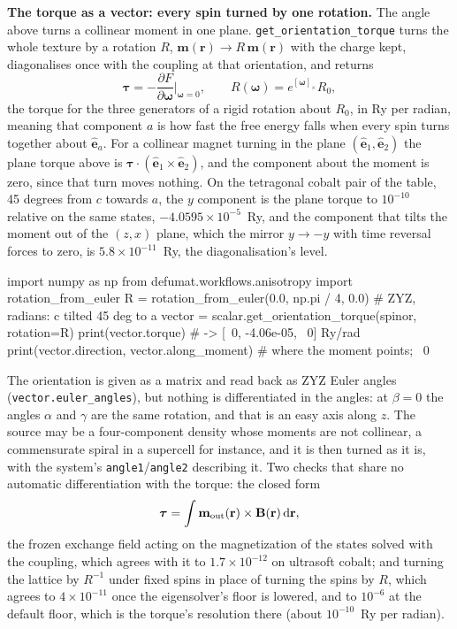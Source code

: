 \documentclass[11pt,a4paper]{article}
\newcommand{\code}[1]{\texttt{\small #1}}
\begin{document}
\textbf{The torque as a vector: every spin turned by one rotation.} The angle
above turns a collinear moment in one plane. \code{get\_orientation\_torque}
turns the whole texture by a rotation $R$, $\mathbf m(\mathbf r)\to
R\,\mathbf m(\mathbf r)$ with the charge kept, diagonalises once with the
coupling at that orientation, and returns
\begin{equation*}
  \boldsymbol\tau = -\frac{\partial F}{\partial\boldsymbol\omega}\bigg|_{\boldsymbol\omega=0},
  \qquad R(\boldsymbol\omega) = e^{[\boldsymbol\omega]_\times} R_0 ,
\end{equation*}
the torque for the three generators of a rigid rotation about $R_0$, in Ry per
radian, meaning that component $a$ is how fast the free energy falls when every
spin turns together about $\hat{\mathbf e}_a$. For a collinear magnet turning in
the plane $(\hat{\mathbf e}_1,\hat{\mathbf e}_2)$ the plane torque above is
$\boldsymbol\tau\cdot(\hat{\mathbf e}_1\times\hat{\mathbf e}_2)$, and the
component about the moment is zero, since that turn moves nothing. On the
tetragonal cobalt pair of the table, 45 degrees from $c$ towards $a$, the $y$
component is the plane torque to $10^{-10}$ relative on the same states,
$-4.0595\times10^{-5}$~Ry, and the component that tilts the moment out of the
$(z,x)$ plane, which the mirror $y\to-y$ with time reversal forces to zero, is
$5.8\times10^{-11}$~Ry, the diagonalisation's level.

\begin{pycode}
import numpy as np
from defumat.workflows.anisotropy import rotation_from_euler
R = rotation_from_euler(0.0, np.pi / 4, 0.0)     # ZYZ, radians: c tilted 45 deg to a
vector = scalar.get_orientation_torque(spinor, rotation=R)
print(vector.torque)                             # -> [~0, -4.06e-05, ~0] Ry/rad
print(vector.direction, vector.along_moment)     # where the moment points; ~0
\end{pycode}

\noindent The orientation is given as a matrix and read back as ZYZ Euler angles
(\code{vector.euler\_angles}), but nothing is differentiated in the angles: at
$\beta=0$ the angles $\alpha$ and $\gamma$ are the same rotation, and that is an
easy axis along $z$. The source may be a four-component density whose moments
are not collinear, a commensurate spiral in a supercell for instance, and it is
then turned as it is, with the system's \code{angle1}/\code{angle2} describing it.
Two checks that share no automatic differentiation with the torque: the closed
form
\begin{equation*}
  \boldsymbol\tau = \int \mathbf m_{\rm out}(\mathbf r)\times\mathbf B(\mathbf r)\,\mathrm d\mathbf r ,
\end{equation*}
the frozen exchange field acting on the magnetization of the states solved with
the coupling, which agrees with it to $1.7\times10^{-12}$ on ultrasoft cobalt;
and turning the lattice by $R^{-1}$ under fixed spins in place of turning the
spins by $R$, which agrees to $4\times10^{-11}$ once the eigensolver's floor is
lowered, and to $10^{-6}$ at the default floor, which is the torque's
resolution there (about $10^{-10}$~Ry per radian).
\end{document}
